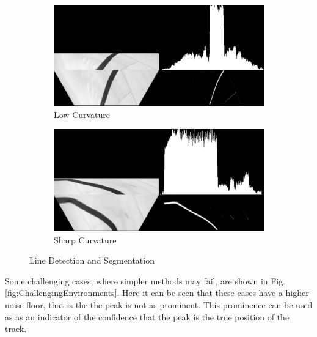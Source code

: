         \begin{figure}[H]
            \centering
            \begin{subfigure}[b]{0.45\textwidth}
                \includegraphics[width=\textwidth]{visionpipeline/vizSmallCurve.png}
                \caption{Low Curvature}
                \label{fig:LineDetection}
            \end{subfigure}
            \hfill
            \begin{subfigure}[b]{0.45\textwidth}
                \includegraphics[width=\textwidth]{visionpipeline/vizBigCurve.png}
                \caption{Sharp Curvature}
                \label{fig:Sharp Curvature}
            \end{subfigure}
            \caption{Line Detection and Segmentation}   
            \label{fig:Line Detection and Segmentation}
        \end{figure}

        Some challenging cases, where simpler methods may fail, are shown in 
        Fig.\ref{fig:ChallengingEnvironments}. Here it can be seen that these cases have a higher noise floor, 
        that is the the peak is not as prominent. This prominence can be used as as an indicator of the confidence that 
        the peak is the true position of the track. 

